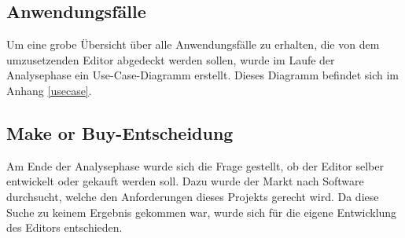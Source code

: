 \subsection{Anwendungsfälle}

Um eine grobe Übersicht über alle Anwendungsfälle zu erhalten, die von dem umzusetzenden Editor
abgedeckt werden sollen, wurde im Laufe der Analysephase ein Use-Case-Diagramm erstellt. Dieses
Diagramm befindet sich im Anhang \ref{usecase}.

\subsection{\glqq Make or Buy\grqq -Entscheidung}
Am Ende der Analysephase wurde sich die Frage gestellt, ob der Editor selber entwickelt oder gekauft werden soll. Dazu wurde der Markt nach Software durchsucht, welche den Anforderungen dieses Projekts gerecht wird. Da diese Suche zu keinem Ergebnis gekommen war, wurde sich für die eigene Entwicklung des Editors entschieden.

\newpage
